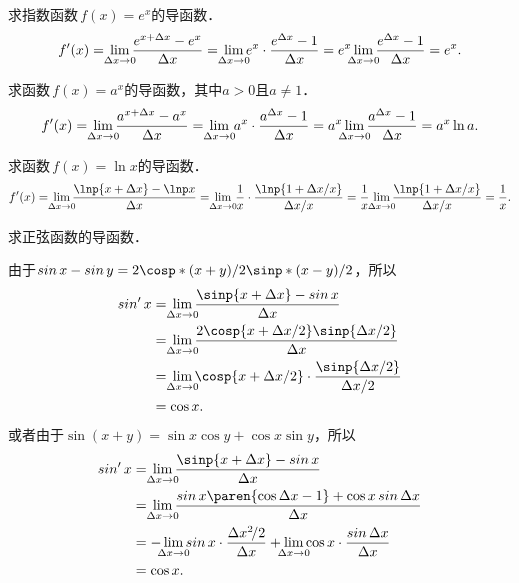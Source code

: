 \begin{example*}
  求指数函数\(\,f(x) = e^x\)的导函数．
  \begin{equation*}
    f'(x)
    = \,\lim_{\mathclap{\fdx \to 0}} \frac{e^{x+\fdx} - e^x}{\fdx}
    = \,\lim_{\mathclap{\fdx \to 0}} e^x \cdot \frac{e^{\fdx} - 1}{\fdx}
    = e^x \lim_{\mathclap{\fdx \to 0}} \frac{e^{\fdx} - 1}{\fdx}
    = e^x.
  \end{equation*}
\end{example*}

\begin{example*}
  求函数\(\,f(x) = a^x\)的导函数，其中\(a > 0\)且\(a \ne 1\)．
  \begin{equation*}
    f'(x)
    = \,\lim_{\mathclap{\fdx \to 0}} \frac{a^{x+\fdx} - a^x}{\fdx}
    = \,\lim_{\mathclap{\fdx \to 0}} \,a^x \cdot \frac{a^{\fdx} - 1}{\fdx}
    = a^x \lim_{\mathclap{\fdx \to 0}} \frac{a^{\fdx} - 1}{\fdx}
    = a^x \ln a.
  \end{equation*}
\end{example*}

\begin{example*}
  求函数\(\,f(x) = \ln x\)的导函数．
  \begin{equation*}
    f'(x)
    = \,\lim_{\mathclap{\fdx \to 0}} \frac{\lnp{x+\fdx}- \lnp x}{\fdx}
    = \,\lim_{\mathclap{\fdx \to 0}} \,\frac1x \cdot \frac{\lnp{1+\fdx/x}}{\fdx/x}
    = \frac1x \,\lim_{\mathclap{\fdx \to 0}} \frac{\lnp{1+\fdx/x}}{\fdx/x}
    = \frac1x.
  \end{equation*}
\end{example*}

\begin{example*}
  求正弦函数的导函数．

  由于\(\sin x - \sin y = 2 \cosp*{(x+y)/2} \sinp*{(x-y)/2}\)，所以
  \begin{align*}
    \sin'x
    &= \,\lim_{\mathclap{\fdx \to 0}} \frac{\sinp{x+\fdx}- \sin x}{\fdx} \\
    &= \,\lim_{\mathclap{\fdx \to 0}} \frac{2 \cosp{x+\fdx/2} \sinp{\fdx/2}}{\fdx} \\
    &= \,\lim_{\mathclap{\fdx \to 0}} \cosp{x+\fdx/2} \cdot \frac{\sinp{\fdx/2}}{\fdx/2} \\
    &= \cos x.
  \end{align*}
  或者由于\(\sin(x+y) = \sin x \cos y + \cos x \sin y\)，所以
  \begin{align*}
    \sin'x
    &= \,\lim_{\mathclap{\fdx \to 0}} \frac{\sinp{x+\fdx}- \sin x}{\fdx} \\
    &= \,\lim_{\mathclap{\fdx \to 0}} \frac{\sin x \paren{\cos \fdx - 1} + \cos x \sin \fdx}{\fdx} \\
    &= -\lim_{\mathclap{\fdx \to 0}} \sin x \cdot \frac{\fdx^2\!/2}{\fdx} + \lim_{\mathclap{\fdx \to 0}} \cos x \cdot \frac{\sin \fdx}{\fdx} \\
    &= \cos x.
  \end{align*}
\end{example*}


